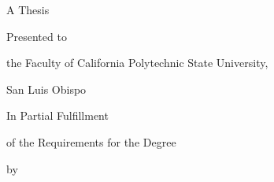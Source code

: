 \begin{titlepage}
\thispagestyle{empty}
\centering
\doublespacing
{\bfseries\MakeUppercase{\ThesisTitle}\par}
\vspace{1.0in}
A Thesis\par
Presented to\par
the Faculty of California Polytechnic State University,\par
San Luis Obispo\par
\vspace{0.7in}
In Partial Fulfillment\par
of the Requirements for the Degree\par
\DegreeName\par
by\par
\ThesisAuthor\par
\SubmissionDate\par
\end{titlepage}
